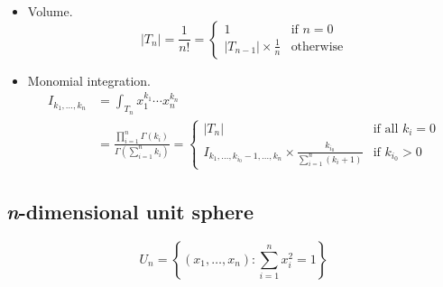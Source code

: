 \documentclass[draft]{scrartcl}
\begin{document}
\begin{itemize}
  \item Volume.
    \begin{equation}
      |T_n| = \frac{1}{n!} = \begin{cases}
        1&\text{if $n=0$}\\
        |T_{n-1}| \times \frac{1}{n}&\text{otherwise}
      \end{cases}
    \end{equation}
  \item Monomial integration.
  \begin{equation}
    \begin{split}
    I_{k_1,\dots,k_n}
    &= \int_{T_n} x_1^{k_1}\cdots x_n^{k_n}\\
    &= \frac{\prod_{i=1}^n\Gamma(k_i)}{\Gamma\left(\sum_{i=1}^n k_i\right)}
    =\begin{cases}
      |T_n|&\text{if all $k_i=0$}\\
      I_{k_1,\dots,k_{i_0}-1,\dots,k_n} \times \frac{k_{i_0}}{\sum_{i=1}^n (k_i+1)}&\text{if $k_{i_0} > 0$}
    \end{cases}
  \end{split}
  \end{equation}
\end{itemize}

\subsection*{\textit{n}-dimensional unit sphere}
\[
  U_n = \left\{(x_1,\dots,x_n): \sum_{i=1}^n x_i^2 = 1\right\}
\]
\end{document}
